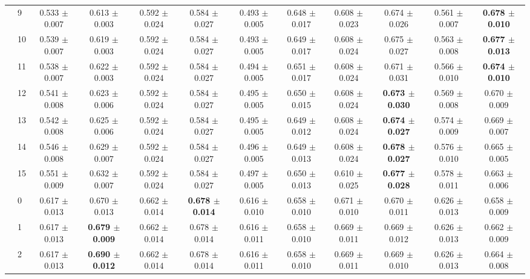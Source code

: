 \begin{table*}[t]
{\begin{tabular}{%
  ll
  @{\quad}
  c@{\hskip 4pt}c
  @{\quad\quad}
  c@{\hskip 4pt}c
  @{\quad\quad}
  c@{\hskip 4pt}c
  @{\quad\quad}
  c@{\hskip 4pt}c
  @{\quad\quad}
  c@{\hskip 4pt}c
}
        & 9 & 0.533 $\pm$ 0.007 & 0.613 $\pm$ 0.003 & 0.592 $\pm$ 0.024 & 0.584 $\pm$ 0.027 & 0.493 $\pm$ 0.005 & 0.648 $\pm$ 0.017 & 0.608 $\pm$ 0.023 & 0.674 $\pm$ 0.026 & 0.561 $\pm$ 0.007 & \textbf{0.678 $\pm$ 0.010} \\
        & 10 & 0.539 $\pm$ 0.007 & 0.619 $\pm$ 0.003 & 0.592 $\pm$ 0.024 & 0.584 $\pm$ 0.027 & 0.493 $\pm$ 0.005 & 0.649 $\pm$ 0.017 & 0.608 $\pm$ 0.024 & 0.675 $\pm$ 0.027 & 0.563 $\pm$ 0.008 & \textbf{0.677 $\pm$ 0.013} \\
        & 11 & 0.538 $\pm$ 0.007 & 0.622 $\pm$ 0.003 & 0.592 $\pm$ 0.024 & 0.584 $\pm$ 0.027 & 0.494 $\pm$ 0.005 & 0.651 $\pm$ 0.017 & 0.608 $\pm$ 0.024 & 0.671 $\pm$ 0.031 & 0.566 $\pm$ 0.010 & \textbf{0.674 $\pm$ 0.010} \\
        & 12 & 0.541 $\pm$ 0.008 & 0.623 $\pm$ 0.006 & 0.592 $\pm$ 0.024 & 0.584 $\pm$ 0.027 & 0.495 $\pm$ 0.005 & 0.650 $\pm$ 0.015 & 0.608 $\pm$ 0.024 & \textbf{0.673 $\pm$ 0.030} & 0.569 $\pm$ 0.008 & 0.670 $\pm$ 0.009 \\
        & 13 & 0.542 $\pm$ 0.008 & 0.625 $\pm$ 0.006 & 0.592 $\pm$ 0.024 & 0.584 $\pm$ 0.027 & 0.495 $\pm$ 0.005 & 0.649 $\pm$ 0.012 & 0.608 $\pm$ 0.024 & \textbf{0.674 $\pm$ 0.027} & 0.574 $\pm$ 0.009 & 0.669 $\pm$ 0.007 \\
        & 14 & 0.546 $\pm$ 0.008 & 0.629 $\pm$ 0.007 & 0.592 $\pm$ 0.024 & 0.584 $\pm$ 0.027 & 0.496 $\pm$ 0.005 & 0.649 $\pm$ 0.013 & 0.608 $\pm$ 0.024 & \textbf{0.678 $\pm$ 0.027} & 0.576 $\pm$ 0.010 & 0.665 $\pm$ 0.005 \\
        & 15 & 0.551 $\pm$ 0.009 & 0.632 $\pm$ 0.007 & 0.592 $\pm$ 0.024 & 0.584 $\pm$ 0.027 & 0.497 $\pm$ 0.005 & 0.650 $\pm$ 0.013 & 0.610 $\pm$ 0.025 & \textbf{0.677 $\pm$ 0.028} & 0.578 $\pm$ 0.011 & 0.663 $\pm$ 0.006 \\
\midrule
\assist{} & 0 & 0.617 $\pm$ 0.013 & 0.670 $\pm$ 0.013 & 0.662 $\pm$ 0.014 & \textbf{0.678 $\pm$ 0.014} & 0.616 $\pm$ 0.010 & 0.658 $\pm$ 0.010 & 0.671 $\pm$ 0.010 & 0.670 $\pm$ 0.011 & 0.626 $\pm$ 0.013 & 0.658 $\pm$ 0.009 \\
        & 1 & 0.617 $\pm$ 0.013 & \textbf{0.679 $\pm$ 0.009} & 0.662 $\pm$ 0.014 & 0.678 $\pm$ 0.014 & 0.616 $\pm$ 0.011 & 0.658 $\pm$ 0.010 & 0.669 $\pm$ 0.011 & 0.669 $\pm$ 0.012 & 0.626 $\pm$ 0.013 & 0.662 $\pm$ 0.009 \\
        & 2 & 0.617 $\pm$ 0.013 & \textbf{0.690 $\pm$ 0.012} & 0.662 $\pm$ 0.014 & 0.678 $\pm$ 0.014 & 0.616 $\pm$ 0.011 & 0.658 $\pm$ 0.010 & 0.669 $\pm$ 0.011 & 0.669 $\pm$ 0.010 & 0.626 $\pm$ 0.013 & 0.664 $\pm$ 0.008 \\

\end{tabular}}
\end{table*}
